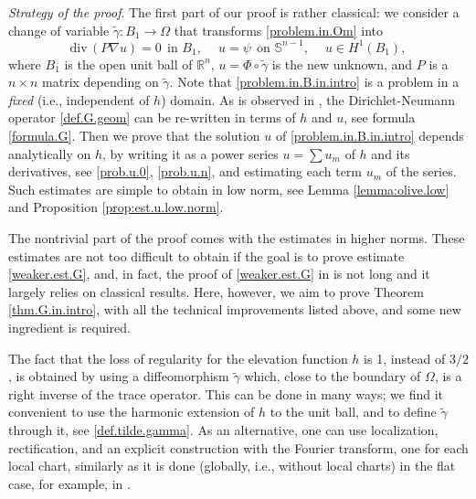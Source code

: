 \documentclass[10pt,reqno,a4paper]{article}
\numberwithin{equation}{section}
\theoremstyle{plain}
\theoremstyle{definition}
\newcommand{\R}{{\mathbb R}}
\renewcommand{\S}{{\mathbb S}}
\newcommand{\Om}{\Omega}
\renewcommand{\div}{\mathrm{div}\,}
\newcommand{\grad}{\nabla}
\begin{document}
\emph{Strategy of the proof}. 
The first part of our proof is rather classical: 
we consider a change of variable $\tilde \gamma : B_1 \to \Omega$ 
that transforms \eqref{problem.in.Om} into 
\begin{equation} \label{problem.in.B.in.intro}
\div (P \grad u) = 0 \ \ \text{in } B_1, \quad \ 
u = \psi \ \ \text{on } \S^{n-1}, \quad \ 
u \in H^1(B_1),
\end{equation}
where $B_1$ is the open unit ball of $\R^n$, 
$u = \Phi \circ \tilde \gamma$ is the new unknown,
and $P$ is a $n \times n$ matrix depending on $\tilde \gamma$. 
Note that \eqref{problem.in.B.in.intro} is a problem in a \emph{fixed} (i.e., independent of $h$) domain. 
As is observed in \cite{BJL}, the Dirichlet-Neumann operator \eqref{def.G.geom} can be re-written 
in terms of $h$ and $u$, see formula \eqref{formula.G}.
Then we prove that the solution $u$ of \eqref{problem.in.B.in.intro} depends analytically on $h$, 
by writing it as a power series $u = \sum u_m$ of $h$ and its derivatives,
see \eqref{prob.u.0}, \eqref{prob.u.n}, and estimating each term $u_m$ of the series. 
Such estimates are simple to obtain in low norm, see Lemma \ref{lemma:olive.low} 
and Proposition \ref{prop:est.u.low.norm}. 

The nontrivial part of the proof comes with the estimates in higher norms. 
These estimates are not too difficult to obtain 
if the goal is to prove estimate \eqref{weaker.est.G}, 
and, in fact, the proof of \eqref{weaker.est.G} in \cite{BJL} 
is not long and it largely relies on classical results. 
Here, however, we aim to prove Theorem \ref{thm.G.in.intro}, 
with all the technical improvements listed above, 
and some new ingredient is required. 

The fact that the loss of regularity for the elevation function $h$ is 1, instead of $3/2$, 
is obtained by using a diffeomorphism $\tilde \gamma$ 
which, close to the boundary of $\Om$, 
is a right inverse of the trace operator. 
This can be done in many ways; we find it convenient 
to use the harmonic extension of $h$ to the unit ball, 
and to define $\tilde \gamma$ through it, see \eqref{def.tilde.gamma}. 
As an alternative, one can use localization, rectification, 
and an explicit construction with the Fourier transform, one for each local chart, 
similarly as it is done (globally, i.e., without local charts) 
in the flat case, for example, in \cite{Lannes.book, Berti.Maspero.Ventura}.   
\end{document}
